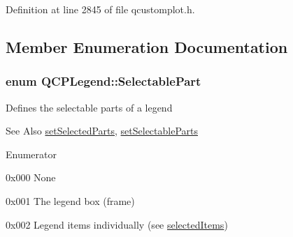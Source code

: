 Definition at line 2845 of file qcustomplot.\-h.



\subsection{Member Enumeration Documentation}
\hypertarget{class_q_c_p_legend_a5404de8bc1e4a994ca4ae69e2c7072f1}{
\subsubsection[{Selectable\-Part}]{\setlength{\rightskip}{0pt plus 5cm}enum {\bf Q\-C\-P\-Legend\-::\-Selectable\-Part}}}\label{class_q_c_p_legend_a5404de8bc1e4a994ca4ae69e2c7072f1}
Defines the selectable parts of a legend

\begin{DoxySeeAlso}{See Also}
\hyperlink{class_q_c_p_legend_a2aee309bb5c2a794b1987f3fc97f8ad8}{set\-Selected\-Parts}, \hyperlink{class_q_c_p_legend_a9ce60aa8bbd89f62ae4fa83ac6c60110}{set\-Selectable\-Parts} 
\end{DoxySeeAlso}
\begin{Desc}
\item[Enumerator]\par
\begin{description}
\item[{\em 
\hypertarget{class_q_c_p_legend_a5404de8bc1e4a994ca4ae69e2c7072f1a378201c07d500af7126e3ec91652eed7}{sp\-None}\label{class_q_c_p_legend_a5404de8bc1e4a994ca4ae69e2c7072f1a378201c07d500af7126e3ec91652eed7}
}]{\ttfamily 0x000} None \item[{\em 
\hypertarget{class_q_c_p_legend_a5404de8bc1e4a994ca4ae69e2c7072f1a0fa4758962a46fa1dc9da818abae23c4}{sp\-Legend\-Box}\label{class_q_c_p_legend_a5404de8bc1e4a994ca4ae69e2c7072f1a0fa4758962a46fa1dc9da818abae23c4}
}]{\ttfamily 0x001} The legend box (frame) \item[{\em 
\hypertarget{class_q_c_p_legend_a5404de8bc1e4a994ca4ae69e2c7072f1a768bfb95f323db4c66473375032c0af7}{sp\-Items}\label{class_q_c_p_legend_a5404de8bc1e4a994ca4ae69e2c7072f1a768bfb95f323db4c66473375032c0af7}
}]{\ttfamily 0x002} Legend items individually (see \hyperlink{class_q_c_p_legend_ac93eaf236e911d67aa8b88942ef45c5e}{selected\-Items}) \end{description}
\end{Desc}


